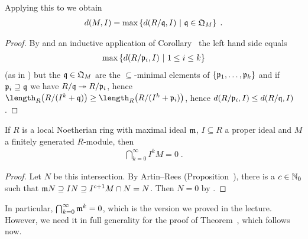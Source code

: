 \documentclass[a4paper,parskip=half,numbers=enddot, DIV=12, headheight=30pt]{scrreprt}
\begin{document}
\begin{cor}
    Applying this to  we obtain 
    \begin{align*}
        d(M,I) = \max\left\{d(R/\mathfrak{q},I) \ \middle|\  \mathfrak{q}\in \mathfrak{Q}_M\right\}\;.
    \end{align*}
\end{cor}
\begin{proof}
    By  and an inductive application of Corollary~ the left hand side equals 
    \begin{align*}
        \max\left\{d(R/\mathfrak{p}_i,I)\ \middle|\  1 \leq i \leq k\right\}
    \end{align*}
    (as in ) but the $\mathfrak{q}\in \mathfrak{Q}_M$ are the $\subseteq$-minimal elements of $\left\{\mathfrak{p}_1,\ldots,\mathfrak{p}_k\right\}$ and if $\mathfrak{p}_i\supseteq \mathfrak{q}$ we have $R/\qq \epimorphism R/\pp_i$, hence $\length_R\big(R/(I^k+\qq)\big) \geq \length_R\big(R/(I^k +\pp_i)\big)$, hence $d(R/\mathfrak{p}_i,I) \leq d(R/\mathfrak{q},I)$.
\end{proof}
\begin{cor}
    If $R$ is a local Noetherian ring with maximal ideal $\mathfrak{m}$, $I\subseteq R$ a proper ideal and $M$ a finitely generated $R$-module, then 
    \begin{align*}
        \bigcap_{k=0}^\infty I^kM =0\;.
    \end{align*}
\end{cor}
\begin{proof}
    Let $N$ be this intersection. By Artin--Rees (Proposition~), there is a $c\in\mathbb{N}_0$ such that $\mathfrak{m} N \supseteq IN\supseteq I^{c+1} M \cap N = N$. Then $N=0$ by \NAK.
\end{proof}
\begin{rem*}
	In particular, $\bigcap_{k=0}^\infty\mathfrak{m}^k=0$, which is the version we proved in the lecture. However, we need it in full generality for the proof of Theorem~, which follows now.
\end{rem*}
\end{document}
